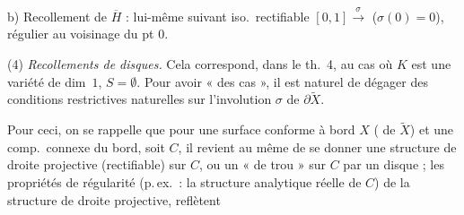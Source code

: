 \documentclass[11pt,a4paper]{article}
\begin{document}
b) Recollement de $\overline{H}$ : lui-même suivant iso.\ rectifiable $[0,1] \xrightarrow{\sigma}$ \uncertain{$[1, 0]$} ($\sigma(0) = 0$), régulier au voisinage du pt $0$.


(4) \emph{Recollements  de disques.}
Cela correspond, dans le th.~4, au cas où $K$ est une variété  de dim~$1$, $S = \emptyset$.  Pour avoir « des cas \ill{} \ill{} », il est naturel de dégager des conditions restrictives naturelles sur l'involution $\sigma$ de $\partial \widetilde{X}$.

Pour ceci, \struck{\ill{}} on se rappelle que pour une surface conforme à bord $X$ (\ill{} de $\widetilde{X}$) et une comp.\ connexe du bord, soit $C$, il revient au même de se donner une structure de droite projective (rectifiable) sur $C$, ou un «  de trou » sur $C$  par un disque ; les propriétés de régularité (p.\,ex.\ : la structure analytique réelle de $C$) de la structure de droite projective, reflètent
\end{document}
